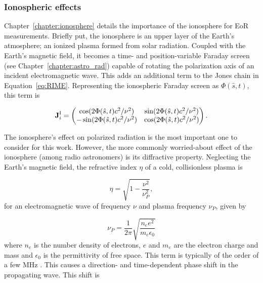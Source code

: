 \subsubsection{Ionospheric effects}
\label{subsubsec:jones-ionosphere}

Chapter~\ref{chapter:ionosphere} details the importance of the ionosphere for EoR measurements. Briefly put, the ionosphere is an upper layer of the Earth's atmosphere; an ionized plasma formed from solar radiation. Coupled with the Earth's magnetic field, it becomes a time- and position-variable Faraday screen (see Chapter~\ref{chapter:astro_rad}) capable of rotating the polarization axis of an incident electromagnetic wave. This adds an additional term to the Jones chain in Equation~\ref{eq:RIME}. Representing the ionospheric Faraday screen as $\Phi (\hat{s},t)$, this term is

\begin{equation}
\textbf{J}_i^{\rm I} = 
\begin{pmatrix}
\cos(2\Phi(\hat{s},t)c^2/\nu^2) & \sin(2\Phi(\hat{s},t)c^2/\nu^2) \\
-\sin(2\Phi(\hat{s},t)c^2/\nu^2) & \cos(2\Phi(\hat{s},t)c^2/\nu^2)\\
\end{pmatrix}.
\end{equation}

The ionosphere's effect on polarized radiation is the most important one to consider for this work. However, the more commonly worried-about effect of the ionosphere (among radio astronomers) is its diffractive property. Neglecting the Earth's magnetic field, the refractive index $\eta$ of a cold, collisionless plasma is \citep{TMS}

\begin{equation}
\eta = \sqrt{1 - \frac{\nu^2}{\nu_P^2}},
\label{eq:diffractive_ionosphere}
\end{equation}
for an electromagnetic wave of frequency $\nu$ and plasma frequency $\nu_P$, given by

\begin{equation}
\nu_P = \frac{1}{2\pi}\sqrt{\frac{n_e e^2}{m_e\epsilon_0}}
\end{equation}
where $n_e$ is the number density of electrons, $e$ and $m_e$ are the electron charge and mass and $\epsilon_0$ is the permittivity of free space. This term is typically of the order of a few MHz \citep{Vedantham.15}. This causes a direction- and time-dependent phase shift in the propagating wave. This shift is 

